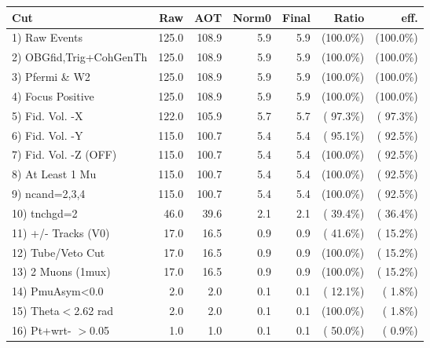  \begin{table}[h!]\centering
 \begin{tabular}{||l||r|r|r|r|r|r||}
 \hline
 \hline
 Cut & Raw & AOT & Norm0 & Final & Ratio & eff.       \\
 \hline
  1) Raw Events           &        125.0 &        108.9 &          5.9 &          5.9 & (100.0\%) & (100.0\%) \\
  2) OBGfid,Trig+CohGenTh &        125.0 &        108.9 &          5.9 &          5.9 & (100.0\%) & (100.0\%) \\
  3) Pfermi \& W2         &        125.0 &        108.9 &          5.9 &          5.9 & (100.0\%) & (100.0\%) \\
  4) Focus Positive       &        125.0 &        108.9 &          5.9 &          5.9 & (100.0\%) & (100.0\%) \\
  5) Fid. Vol. -X         &        122.0 &        105.9 &          5.7 &          5.7 & ( 97.3\%) & ( 97.3\%) \\
  6) Fid. Vol. -Y         &        115.0 &        100.7 &          5.4 &          5.4 & ( 95.1\%) & ( 92.5\%) \\
  7) Fid. Vol. -Z (OFF)   &        115.0 &        100.7 &          5.4 &          5.4 & (100.0\%) & ( 92.5\%) \\
  8) At Least 1 Mu        &        115.0 &        100.7 &          5.4 &          5.4 & (100.0\%) & ( 92.5\%) \\
  9) ncand=2,3,4          &        115.0 &        100.7 &          5.4 &          5.4 & (100.0\%) & ( 92.5\%) \\
 10) tnchgd=2             &         46.0 &         39.6 &          2.1 &          2.1 & ( 39.4\%) & ( 36.4\%) \\
 11) +/- Tracks (V0)      &         17.0 &         16.5 &          0.9 &          0.9 & ( 41.6\%) & ( 15.2\%) \\
 12) Tube/Veto Cut        &         17.0 &         16.5 &          0.9 &          0.9 & (100.0\%) & ( 15.2\%) \\
 13) 2 Muons (1mux)       &         17.0 &         16.5 &          0.9 &          0.9 & (100.0\%) & ( 15.2\%) \\
 14) PmuAsym<0.0          &          2.0 &          2.0 &          0.1 &          0.1 & ( 12.1\%) & (  1.8\%) \\
 15) Theta$<$2.62 rad     &          2.0 &          2.0 &          0.1 &          0.1 & (100.0\%) & (  1.8\%) \\
 16) Pt+wrt- $>$0.05      &          1.0 &          1.0 &          0.1 &          0.1 & ( 50.0\%) & (  0.9\%) \\

\end{tabular}
\end{table}
